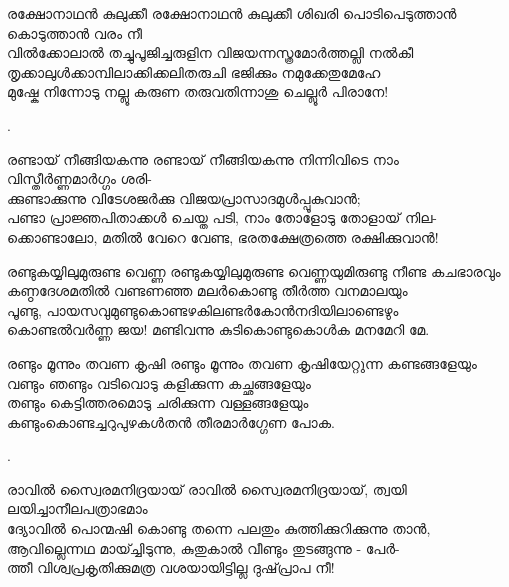 \begin{enumerate}


\begin{slokam}{\VSr}{\Unk}{രക്ഷോനാഥൻ കുലുക്കീ}
രക്ഷോനാഥൻ കുലുക്കീ ശിഖരി പൊടിപെടുത്താൻ കൊടുത്താൻ വരം നീ\\
വിൽക്കോലാൽ തച്ചുപൂജിച്ചരുളിന വിജയന്നസ്ത്രമോർത്തല്ലി നൽകീ\\
തൃക്കാലുൾക്കാമ്പിലാക്കിക്കലിതരുചി ഭജിക്കും നമുക്കേതുമേഹേ\\
മുഷ്കേ നിന്നോടു നല്ലൂ കരുണ തരുവതിന്നാശു ചെല്ലൂർ പിരാനേ!
\end{slokam}


. 


\begin{slokam}{\VSv}{\VNM}{രണ്ടായ്‌ നീങ്ങിയകന്നു}
 രണ്ടായ്‌ നീങ്ങിയകന്നു നിന്നിവിടെ നാം വിസ്തീർണ്ണമാർഗ്ഗം ശരി-\\
ക്കുണ്ടാക്കുന്നു വിടേശജർക്കു വിജയപ്രാസാദമുള്‍പ്പൂകുവാൻ;\\
പണ്ടാ പ്രാജ്ഞപിതാക്കള്‍ ചെയ്ത പടി, നാം തോളോടു തോളായ്‌ നില-\\
ക്കൊണ്ടാലോ, മതിൽ വേറെ വേണ്ട, ഭരതക്ഷേത്രത്തെ രക്ഷിക്കുവാൻ!
\end{slokam}


\begin{slokam}{\VKm}{\VenM}{രണ്ടുകയ്യിലുമുരുണ്ട വെണ്ണ}
രണ്ടുകയ്യിലുമുരുണ്ട വെണ്ണയുമിരുണ്ടു നീണ്ട കചഭാരവും\\
കണ്ഠദേശമതിൽ വണ്ടണഞ്ഞ മലർകൊണ്ടു തീർത്ത വനമാലയും\\
പൂണ്ടു, പായസവുമുണ്ടുകൊണ്ടഴകിലണ്ടർകോൻനദിയിലാണ്ടെഴും\\
കൊണ്ടൽവർണ്ണ ജയ! മണ്ടിവന്നു കുടികൊണ്ടുകൊള്‍ക മനമേറി മേ.
\end{slokam}



\begin{slokam}{\VMk}{\KV}{രണ്ടും മൂന്നും തവണ കൃഷി}
രണ്ടും മൂന്നും തവണ കൃഷിയേറ്റുന്ന കണ്ടങ്ങളേയും\\
വണ്ടും ഞണ്ടും വടിവൊടു കളിക്കുന്ന കച്ഛങ്ങളേയും\\
തണ്ടും കെട്ടിത്തരമൊടു ചരിക്കുന്ന വള്ളങ്ങളേയും\\
കണ്ടുംകൊണ്ടച്ചറുപുഴകൾതൻ തീരമാർഗ്ഗേണ പോക.
\end{slokam}


.


\begin{slokam}{\VSv}{\VNM}{രാവിൽ സ്വൈരമനിദ്രയായ്‌}
 രാവിൽ സ്വൈരമനിദ്രയായ്‌, ത്വയി ലയിച്ചാനീലപത്രാഭമാം\\
ദ്യോവിൽ പൊന്മഷി കൊണ്ടു തന്നെ പലതും കുത്തിക്കുറിക്കുന്നു താൻ,\\
ആവില്ലെന്നഥ മായ്ച്ചിടുന്നു, കുതുകാൽ വീണ്ടും തുടങ്ങുന്നു - പേർ-\\
ത്തീ വിശ്വപ്രകൃതിക്കുമത്ര വശയായിട്ടില്ല ദുഷ്‌പ്രാപ നീ!
\end{slokam}


\end{enumerate}
